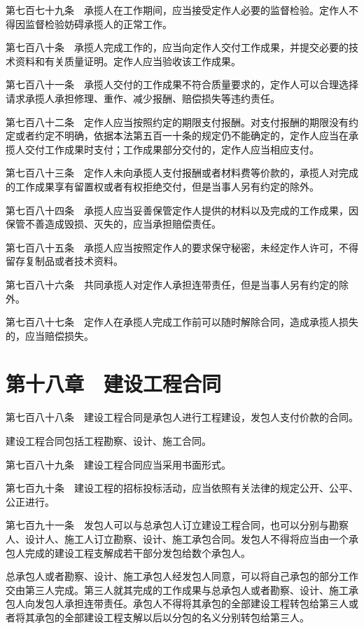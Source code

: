 \documentclass[UTF8,12pt,a4paper]{ctexbook}
\begin{document}
第七百七十九条　承揽人在工作期间，应当接受定作人必要的监督检验。定作人不得因监督检验妨碍承揽人的正常工作。

第七百八十条　承揽人完成工作的，应当向定作人交付工作成果，并提交必要的技术资料和有关质量证明。定作人应当验收该工作成果。

第七百八十一条　承揽人交付的工作成果不符合质量要求的，定作人可以合理选择请求承揽人承担修理、重作、减少报酬、赔偿损失等违约责任。

第七百八十二条　定作人应当按照约定的期限支付报酬。对支付报酬的期限没有约定或者约定不明确，依据本法第五百一十条的规定仍不能确定的，定作人应当在承揽人交付工作成果时支付；工作成果部分交付的，定作人应当相应支付。

第七百八十三条　定作人未向承揽人支付报酬或者材料费等价款的，承揽人对完成的工作成果享有留置权或者有权拒绝交付，但是当事人另有约定的除外。

第七百八十四条　承揽人应当妥善保管定作人提供的材料以及完成的工作成果，因保管不善造成毁损、灭失的，应当承担赔偿责任。

第七百八十五条　承揽人应当按照定作人的要求保守秘密，未经定作人许可，不得留存复制品或者技术资料。

第七百八十六条　共同承揽人对定作人承担连带责任，但是当事人另有约定的除外。

第七百八十七条　定作人在承揽人完成工作前可以随时解除合同，造成承揽人损失的，应当赔偿损失。

\section*{第十八章　建设工程合同}

第七百八十八条　建设工程合同是承包人进行工程建设，发包人支付价款的合同。

建设工程合同包括工程勘察、设计、施工合同。

第七百八十九条　建设工程合同应当采用书面形式。

第七百九十条　建设工程的招标投标活动，应当依照有关法律的规定公开、公平、公正进行。

第七百九十一条　发包人可以与总承包人订立建设工程合同，也可以分别与勘察人、设计人、施工人订立勘察、设计、施工承包合同。发包人不得将应当由一个承包人完成的建设工程支解成若干部分发包给数个承包人。

总承包人或者勘察、设计、施工承包人经发包人同意，可以将自己承包的部分工作交由第三人完成。第三人就其完成的工作成果与总承包人或者勘察、设计、施工承包人向发包人承担连带责任。承包人不得将其承包的全部建设工程转包给第三人或者将其承包的全部建设工程支解以后以分包的名义分别转包给第三人。
\end{document}
